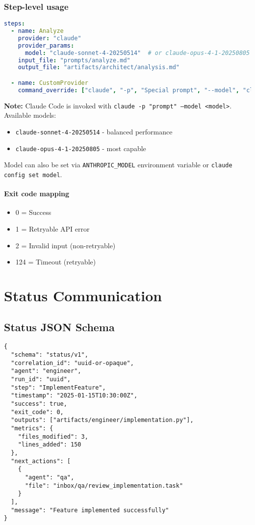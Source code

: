 \documentclass[11pt,a4paper]{article}
\begin{document}
\subsubsection{Step-level usage}

\begin{lstlisting}[language=yaml, caption={Step-level Provider Usage}]
steps:
  - name: Analyze
    provider: "claude"
    provider_params:
      model: "claude-sonnet-4-20250514"  # or claude-opus-4-1-20250805 for more capability
    input_file: "prompts/analyze.md"
    output_file: "artifacts/architect/analysis.md"

  - name: CustomProvider
    command_override: ["claude", "-p", "Special prompt", "--model", "claude-opus-4-1-20250805"]
\end{lstlisting}

\textbf{Note:} Claude Code is invoked with \texttt{claude -p "prompt" --model <model>}. Available models:
\begin{itemize}
    \item \texttt{claude-sonnet-4-20250514} - balanced performance
    \item \texttt{claude-opus-4-1-20250805} - most capable
\end{itemize}

Model can also be set via \texttt{ANTHROPIC\_MODEL} environment variable or \texttt{claude config set model}.

\paragraph{Exit code mapping}
\begin{itemize}
    \item 0 = Success
    \item 1 = Retryable API error
    \item 2 = Invalid input (non-retryable)
    \item 124 = Timeout (retryable)
\end{itemize}

\section{Status Communication}

\subsection{Status JSON Schema}

\begin{lstlisting}[caption={Status JSON Schema}]
{
  "schema": "status/v1",
  "correlation_id": "uuid-or-opaque",
  "agent": "engineer",
  "run_id": "uuid",
  "step": "ImplementFeature",
  "timestamp": "2025-01-15T10:30:00Z",
  "success": true,
  "exit_code": 0,
  "outputs": ["artifacts/engineer/implementation.py"],
  "metrics": {
    "files_modified": 3,
    "lines_added": 150
  },
  "next_actions": [
    {
      "agent": "qa",
      "file": "inbox/qa/review_implementation.task"
    }
  ],
  "message": "Feature implemented successfully"
}
\end{lstlisting}
\end{document}
